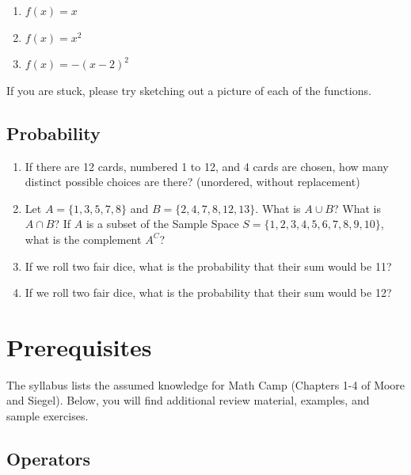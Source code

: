 \documentclass[
  letterpaper,
]{book}
\providecommand{\tightlist}{%
  \setlength{\itemsep}{0pt}\setlength{\parskip}{0pt}}\usepackage{longtable,booktabs,array}
\theoremstyle{definition}
\theoremstyle{definition}
\theoremstyle{plain}
\theoremstyle{definition}
\theoremstyle{plain}
\theoremstyle{plain}
\theoremstyle{remark}
\begin{document}
\begin{enumerate}
\def\labelenumi{\arabic{enumi}.}
\tightlist
\item
  \(f(x) = x\)
\item
  \(f(x) = x^2\)
\item
  \(f(x) = -(x - 2)^2\)
\end{enumerate}

If you are stuck, please try sketching out a picture of each of the
functions.

\hypertarget{probability}{%
\section*{Probability}\label{probability}}

\begin{enumerate}
\def\labelenumi{\arabic{enumi}.}
\tightlist
\item
  If there are 12 cards, numbered 1 to 12, and 4 cards are chosen, how
  many distinct possible choices are there? (unordered, without
  replacement)
\item
  Let \(A = \{1,3,5,7,8\}\) and \(B = \{2,4,7,8,12,13\}\). What is
  \(A \cup B\)? What is \(A \cap B\)? If \(A\) is a subset of the Sample
  Space \(S = \{1,2,3,4,5,6,7,8,9,10\}\), what is the complement
  \(A^C\)?
\item
  If we roll two fair dice, what is the probability that their sum would
  be 11?
\item
  If we roll two fair dice, what is the probability that their sum would
  be 12?
\end{enumerate}


\hypertarget{prerequisites}{%
\chapter*{Prerequisites}\label{prerequisites}}

The syllabus lists the assumed knowledge for Math Camp (Chapters 1-4 of
Moore and Siegel). Below, you will find additional review material,
examples, and sample exercises.

\hypertarget{operators}{%
\section*{Operators}\label{operators}}
\end{document}
